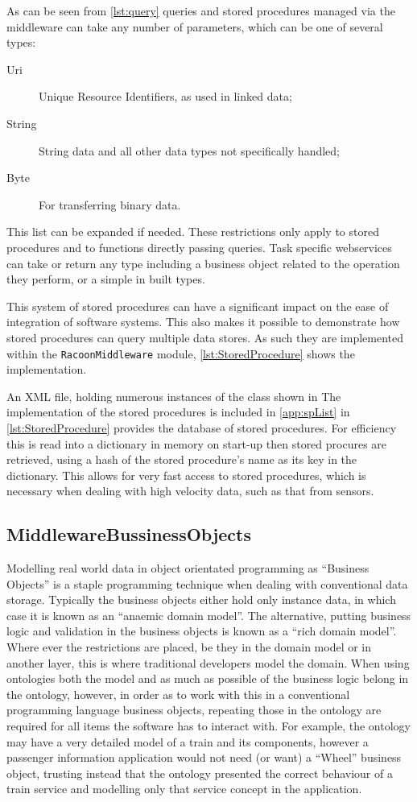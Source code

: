 As can be seen from \autoref{lst:query} queries and stored procedures managed via the middleware can take any number of parameters, which can be one of several types:

\begin{description}
    \item[Uri]  Unique Resource Identifiers, as used in linked data;
    \item[String] String data and all other data types not specifically handled;    
    \item[Byte] For transferring binary data.
\end{description}

This list can be expanded if needed. These restrictions only apply to stored procedures and to functions directly passing queries. Task specific webservices can take or return any type including a business object related to the operation they perform, or a simple in built types.

This system of stored procedures can have a significant impact on the ease of integration of software systems. This also makes it possible to demonstrate how stored procedures can query multiple data stores. As such they are implemented within the  \texttt{RacoonMiddleware} module, \autoref{lst:StoredProcedure} shows the implementation.

An XML file, holding numerous instances of the class shown in The implementation of the stored procedures is included in \autoref{app:spList} in \autoref{lst:StoredProcedure} provides the database of stored procedures. For efficiency this is read into a dictionary in memory on start-up then stored procures are retrieved, using a hash of the stored procedure's name as its key in the dictionary. This allows for very fast access to stored procedures, which is necessary when dealing with high velocity data, such as that from sensors.

\subsection{MiddlewareBussinessObjects}
Modelling real world data in object orientated programming as \enquote{Business Objects} is a staple programming technique when dealing with conventional data storage. Typically the business objects either hold only instance data, in which case it is known as an \enquote{anaemic domain model}. The alternative, putting business logic and validation in the business objects is known as a \enquote{rich domain model}. Where ever the restrictions are placed, be they in the domain model or in another layer, this is where traditional developers model the domain. When using ontologies both the model and as much as possible of the business logic belong in the ontology, however, in order as to work with this in a conventional programming language business objects, repeating those in the ontology are required for all items the software has to interact with. For example, the ontology may have a very detailed model of a train and its components, however a passenger information application would not need (or want) a ``Wheel'' business object, trusting instead that the ontology presented the correct behaviour of a train service and modelling only that service concept in the application. 

